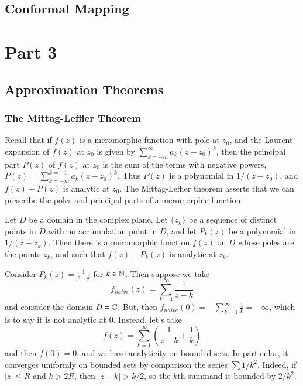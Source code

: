 \documentclass[12pt, a4paper, oneside, openright, titlepage]{book}
\begin{document}
\chapter{Conformal Mapping}





\part{Part 3}

\chapter{Approximation Theorems}


\section{The Mittag-Leffler Theorem}

Recall that if $f(z)$ is a meromorphic function with pole at $z_0$, and the Laurent expansion of $f(z)$ at $z_0$ is given by $\sum_{k=-m}^{\infty}a_k(z-z_0)^k$, then the principal part $P(z)$ of $f(z)$ at $z_0$ is the sum of the terms with negative powers, $P(z) = \sum_{k=-m}^{k=-1}a_k(z-z_0)^k$. Thus $P(z)$ is a polynomial in $1/(z-z_0)$, and $f(z)-P(z)$ is analytic at $z_0$. The Mittag-Leffler theorem asserts that we can prescribe the poles and principal parts of a meromorphic function.

\begin{namthm}
    Let $D$ be a domain in the complex plane. Let $\{z_k\}$ be a sequence of distinct points in $D$ with no accumulation point in $D$, and let $P_k(z)$ be a polynomial in $1/(z-z_k)$. Then there is a meromorphic function $f(z)$ on $D$ whose poles are the points $z_k$, and such that $f(z) - P_k(z)$ is analytic at $z_k$.
\end{namthm}


\begin{eg}
    Consider $P_k(z) = \frac{1}{z-k}$ for $k \in \mathbb N$. Then suppose we take \begin{equation*}
        f_{naive}(z) = \sum_{k=1}^{\infty}\frac{1}{z-k}
    \end{equation*}
    and consider the domain $D = \mathbb C$. But, then $f_{naive}(0) = -\sum_{k=1}^{\infty}\frac{1}{k} = -\infty$, which is to say it is not analytic at $0$. Instead, let's take \begin{equation*}
        f(z) = \sum_{k=1}^{\infty}\left(\frac{1}{z-k}+\frac{1}{k}\right)
    \end{equation*}
    and then $f(0) = 0$, and we have analyticity on bounded sets. In particular, it converges uniformly on bounded sets by comparison the series $\sum 1/k^2$. Indeed, if $|z| \leq R$ and $k > 2R$, then $|z-k| > k/2$, so the $k$th summand is bounded by $2/k^2$.
\end{eg}
\end{document}
